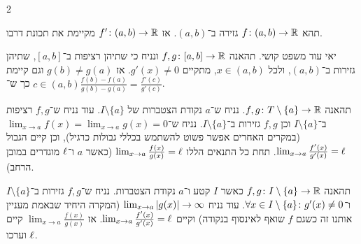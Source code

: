 \documentclass[]{../../../tex/classes/styledArticle}
\begin{document}
\begin{multicols}{2}
		\begin{Theorem}
			תהא $f \colon (a, b) \to \mathbb{R}$ גזירה ב־$(a, b)$. אז $f' \colon (a, b) \to \mathbb{R}$ מקיימת את תכונת דרבו.
		\end{Theorem}
		\begin{Theorem}
			יאי עוד משפט קושי. תהאנה $f, g \colon [a, b] \to \mathbb{R}$ ונניח כי שתיהן רציפות ב־$[a, b]$, שתיהן גזירות ב־$(a, b)$, ולכל $x \in (a, b)$, מתקיים $g'(x) \neq 0$. אז $g(b) \neq g(a)$ וגם קיימת $c \in (a, b)$ כך ש־$\frac{f(b) - f(a)}{g(b) - g(a)} = \frac{f'(c)}{g'(c)}$. 
		\end{Theorem}
		\begin{Theorem}
			תהאנה $f, g \colon T \setminus \{a\} \to \mathbb{R}$. נניח ש־$a$ נקודת הצטברות של $I \setminus \{a\}$. עוד נניח ש־$f, g$ רציפות ב־$I \setminus \{a\}$ וכן $f, g$ גזירות ב־$I \setminus \{a\}$. נניח ש־$\lim_{x \to a} f(x) = \lim_{x \to a} g(x) = 0$ (במקרים האחרים אפשר פשוט להשתמש בכללי גבולות כרגיל), וכן קיים הגבול $\lim_{x \to a} \frac{f'(x)}{g'(x)}  = \ell$. תחת כל התנאים הללו $\lim_{x \to a}\frac{f(x)}{g(x)} = \ell$ (כאשר $a$ ו־$\ell$ מוגדרים במובן הרחב).
		\end{Theorem}
		\begin{Theorem}
			תהאנה $f, g \colon I \setminus \{a\} \to \mathbb{R}$ כאשר $I$ קטע ו־$a$ נקודת הצטברות. נניח ש־$f, g$ גזירות ב־$I \setminus \{a\}$ ו־$\forall x \in I \setminus \{a\} \colon g'(x) \neq 0$. עוד נניח $\lim_{x \to a}\left \lvert g(x) \right \rvert \to \infty$ (המקרה היחיד שבאמת מעניין אותנו זה כשגם $f$ שואף לאינסוף בנקודה) וקיים $\lim_{x \to a} \frac{f'(x)}{g'(x)} = \ell$. אז $\lim_{x \to a}\frac{f(x)}{g(x)}$ קיים וערכו $\ell$.
		\end{Theorem}
		

\end{multicols}
\end{document}
